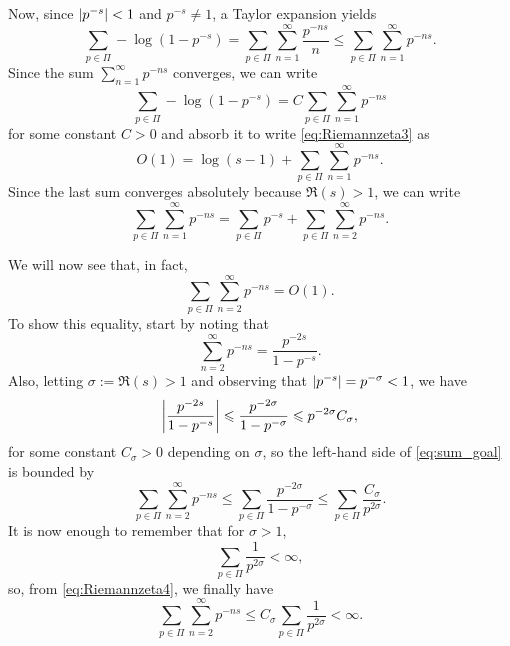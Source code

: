 \documentclass[../main.tex]{subfiles}
\begin{document}
Now, since $\abs{p^{-s}}<1$ and $p^{-s}\neq 1$, a Taylor expansion yields
\begin{equation*}
	\sum_{p\in \Pi}-\log(1-p^{-s})=\sum_{p\in \Pi}\sum_{n=1}^{\infty}\frac{p^{-ns}}{n}\leqslant \sum_{p\in \Pi}\sum_{n=1}^{\infty}p^{-ns}.
\end{equation*}
Since the sum $\sum_{n=1}^{\infty}p^{-ns}$ converges, we can write 
 \begin{equation*}
 	\sum_{p\in \Pi}-\log(1-p^{-s})=C\sum_{p\in \Pi}\sum_{n=1}^{\infty}p^{-ns}
 \end{equation*}
for some constant $C>0$ and absorb it to write \cref{eq:Riemannzeta3} as
\begin{equation}\label{eq:O1}
	O(1)=\log(s-1)+\sum_{p\in \Pi}\sum_{n=1}^{\infty}p^{-ns}.
\end{equation}
Since the last sum converges absolutely because $\Re(s)>1$, we can write
\begin{equation}\label{eq:O1_2}
\sum_{p\in \Pi}\sum_{n=1}^{\infty}p^{-ns}=\sum_{p\in \Pi}p^{-s}+\sum_{p\in \Pi}\sum_{n=2}^{\infty}p^{-ns}.
\end{equation}

We will now see that, in fact, 
\begin{equation}\label{eq:sum_goal}
	\sum_{p\in \Pi}\sum_{n=2}^{\infty}p^{-ns}=O(1).
\end{equation}
To show this equality, start by noting that
\begin{equation*}
	\sum_{n=2}^{\infty}p^{-ns}=\frac{p^{-2s}}{1-p^{-s}}.
\end{equation*}
Also, letting $\sigma:=\Re(s)>1$ and observing that $\abs{p^{-s}}=p^{-\sigma}<1$, we have
\begin{equation*}
	\abs{\frac{p^{-2s}}{1-p^{-s}}}\leqslant \frac{p^{-2\sigma}}{1-p^{-\sigma}}\leqslant p^{-2\sigma}C_\sigma,
\end{equation*}
for some constant $C_\sigma>0$ depending on $\sigma$, so the left-hand side of \cref{eq:sum_goal} is bounded by
\begin{equation}\label{eq:Riemannzeta4}
	\sum_{p\in \Pi}\sum_{n=2}^{\infty}p^{-ns} \leqslant \sum_{p\in \Pi}\frac{p^{-2\sigma}}{1-p^{-\sigma}}\leqslant \sum_{p\in \Pi}\frac{C_\sigma}{p^{2\sigma}}.
\end{equation}
It is now enough to remember that for $\sigma>1$, 
\begin{equation*}
	\sum_{p\in \Pi}\frac{1}{p^{2\sigma}}<\infty,
\end{equation*}
so, from \cref{eq:Riemannzeta4}, we finally have
\begin{equation*}
	\sum_{p\in \Pi}\sum_{n=2}^{\infty}p^{-ns} \leqslant C_\sigma\sum_{p\in \Pi}\frac{1}{p^{2\sigma}}<\infty.
\end{equation*} 
\end{document}
